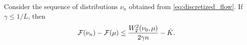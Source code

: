 \begin{theorem}\label{th:rates_mmd}
	Consider the sequence of distributions $\nu_n$ obtained from \cref{eq:discretized_flow}. If $\gamma \leq 1/L$, then
\begin{align}
{{\mathcal F}}(\nu_n)-{{\mathcal F}}(\mu)\leq  \frac{W_2^2(\nu_0,\mu)}{2 \gamma n} -\bar{K}.
\end{align}
\end{theorem}

